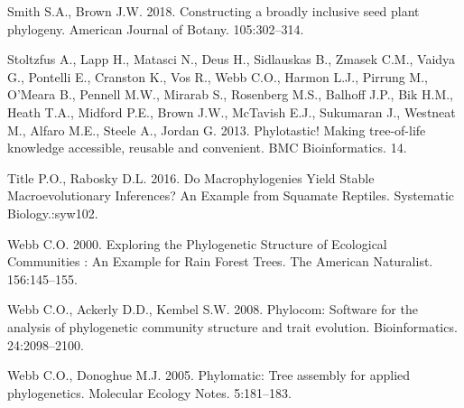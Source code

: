 \documentclass[]{article}
\begin{document}
\leavevmode\hypertarget{ref-smith2018constructing}{}%
Smith S.A., Brown J.W. 2018. Constructing a broadly inclusive seed plant phylogeny. American Journal of Botany. 105:302--314.

\leavevmode\hypertarget{ref-Stoltzfus2013}{}%
Stoltzfus A., Lapp H., Matasci N., Deus H., Sidlauskas B., Zmasek C.M., Vaidya G., Pontelli E., Cranston K., Vos R., Webb C.O., Harmon L.J., Pirrung M., O'Meara B., Pennell M.W., Mirarab S., Rosenberg M.S., Balhoff J.P., Bik H.M., Heath T.A., Midford P.E., Brown J.W., McTavish E.J., Sukumaran J., Westneat M., Alfaro M.E., Steele A., Jordan G. 2013. Phylotastic! Making tree-of-life knowledge accessible, reusable and convenient. BMC Bioinformatics. 14.

\leavevmode\hypertarget{ref-title2016macrophylogenies}{}%
Title P.O., Rabosky D.L. 2016. Do Macrophylogenies Yield Stable Macroevolutionary Inferences? An Example from Squamate Reptiles. Systematic Biology.:syw102.

\leavevmode\hypertarget{ref-Webb2000}{}%
Webb C.O. 2000. Exploring the Phylogenetic Structure of Ecological Communities : An Example for Rain Forest Trees. The American Naturalist. 156:145--155.

\leavevmode\hypertarget{ref-Webb2008}{}%
Webb C.O., Ackerly D.D., Kembel S.W. 2008. Phylocom: Software for the analysis of phylogenetic community structure and trait evolution. Bioinformatics. 24:2098--2100.

\leavevmode\hypertarget{ref-webb2005phylomatic}{}%
Webb C.O., Donoghue M.J. 2005. Phylomatic: Tree assembly for applied phylogenetics. Molecular Ecology Notes. 5:181--183.

\end{document}
